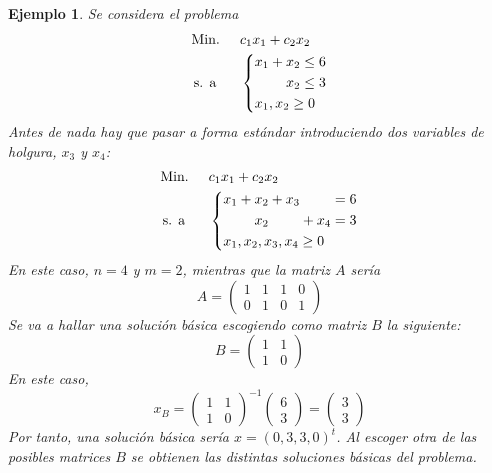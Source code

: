 \documentclass[11pt]{report}
\theoremstyle{mytheorem}
\theoremstyle{mydefinition}
\theoremstyle{myexample}
\newtheorem*{example}{Ejemplo}
\begin{document}
\begin{example}
Se considera el problema
\[\begin{aligned}[t]
&\text{Min. } &&c_1x_1+c_2x_2 \\
& \, \text{s. a} && \left\{\begin{alignedat}{10}
& x_1 & {}+{} & x_2 {}\leq{} 6 \\
&     &       & x_2 {}\leq{} 3 \\
& \mathrlap{x_1, x_2 \geq 0} \\
\end{alignedat} \right.
\end{aligned}\]
Antes de nada hay que pasar a forma estándar introduciendo dos variables de holgura, $x_3$ y $x_4$:
\[\begin{aligned}[t]
&\text{Min. } &&c_1x_1+c_2x_2 \\
& \, \text{s. a} && \left\{\begin{alignedat}{10}
& x_1 & {}+{} & x_2 & {}+{} & x_3 &       &     & {}={} 6 \\
&     &       & x_2 &       &     & {}+{} & x_4 & {}={} 3 \\
& \mathrlap{x_1, x_2,x_3,x_4 \geq 0}
\end{alignedat} \right.
\end{aligned}\]
En este caso, $n = 4$ y $m = 2$, mientras que la matriz $A$ sería
\[A = \begin{pmatrix}
    1 & 1 & 1 & 0 \\
    0 & 1 & 0 & 1
\end{pmatrix}\]
Se va a hallar una solución básica escogiendo como matriz $B$ la siguiente:
\[B = \begin{pmatrix}
    1 & 1 \\
    1 & 0
\end{pmatrix}\]
En este caso,
\[x_B = \begin{pmatrix}
    1 & 1 \\
    1 & 0
\end{pmatrix}^{-1} \begin{pmatrix}
    6 \\
    3
\end{pmatrix} = \begin{pmatrix}
    3 \\
    3
\end{pmatrix}\]
Por tanto, una solución básica sería $x = (0,3,3,0)^t$. Al escoger otra de las posibles matrices $B$ se obtienen las distintas soluciones básicas del problema.
\end{example}
\end{document}

